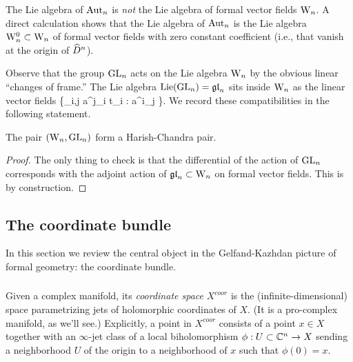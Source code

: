 \documentclass[10pt]{amsart}
\def\brian{\textcolor{blue}{BW: }\textcolor{blue}}
\begin{document}
The Lie algebra of ${\rm Aut}_n$ is {\em not} the Lie algebra of formal
vector fields ${{\rm W}_n}$. A direct
calculation shows that the Lie algebra of ${\rm Aut}_n$ is the Lie algebra ${{\rm W}^0_n} \subset {{\rm W}_n}$ of formal vector fields with zero constant coefficient (i.e., that vanish at the origin of $\widehat{D}^n$). 

Observe that the group ${\rm GL}_n$ acts on the Lie algebra ${{\rm W}_n}$ by the obvious linear ``changes of frame.''
The Lie algebra ${\rm Lie}({{\rm GL}_n}) = {\mathfrak{gl}}_n$ sits inside ${{\rm W}_n}$ as the linear vector fields
\ben
\left\{\sum_{i,j} a^j_i t_i  \; : \; a^{i}_j \in \CC \right\}.
\een 
We record these compatibilities in the following statement.

\begin{lem} 
The pair $({{\rm W}_n}, {\rm GL}_n)$ form a Harish-Chandra pair.
\end{lem}
\begin{proof} The only thing to check is that the differential of the
  action of ${\rm GL}_n$ corresponds with the adjoint action of ${\mathfrak{gl}}_n
  \subset {{\rm W}_n}$ on formal vector fields. This is by construction. 
\end{proof}

\subsection{The coordinate bundle}

In this section we review the central object in the Gelfand-Kazhdan
picture of formal geometry: the coordinate bundle.


\subsubsection{}

Given a complex manifold, its {\em coordinate space} $X^{coor}$ is the (infinite-dimensional) space parametrizing jets of holomorphic coordinates of $X$. 
(It is a pro-complex manifold, as we'll see.) 
Explicitly, a point in $X^{coor}$ consists of a point $x \in X$ 
together with an $\infty$-jet class of a local biholomorphism $\phi : U \subset \mathbb C^n \to X$ 
sending a neighborhood $U$ of the origin to a neighborhood of $x$ such that $\phi(0) = x$. 
\end{document}
